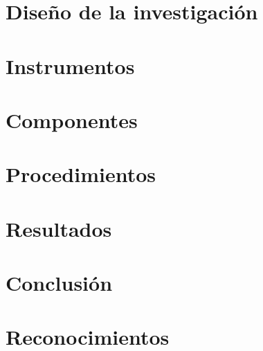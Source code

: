 \documentclass[journal]{IEEEtran}
\begin{document}
\section{Diseño de la investigación}


\section{Instrumentos}


\section{Componentes}


\section{Procedimientos}


\section{Resultados}


\section{Conclusión}


\appendices


\section*{Reconocimientos}





\end{document}

